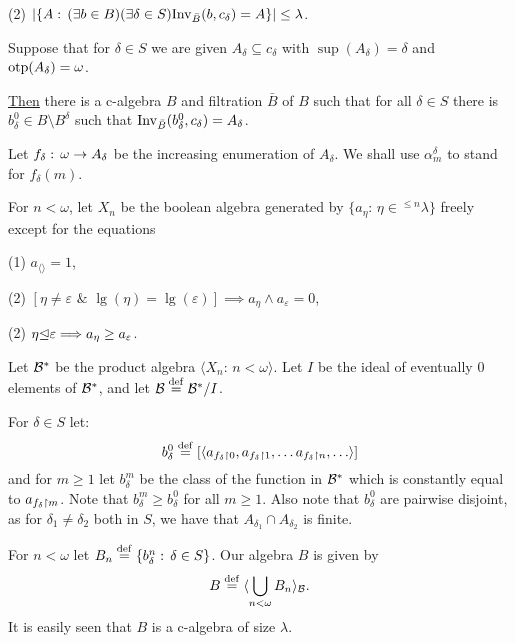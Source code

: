 \begin{Proof}
\begin{Note}

{\noindent (2)}
${\vert \{A:\,(\exists b\in B)(\exists\delta\in S) {\rm Inv}_{\bar{B}}(b,c_\delta)
=A\} \vert}\le\lambda$.
\end{Note}

\begin{Main Claim}\label{main} Suppose that
for $\delta\in S$ we are given $A_\delta\subseteq c_\delta$
with $\sup(A_\delta)=\delta$ and $\hbox{otp($A_\delta$)}=\omega$.

\underline{Then} there is a c-algebra $B$ and filtration $\bar{B}$ of $B$ such that
for all $\delta\in S$
there is $b^0_\delta\in B\setminus B^\delta$
such that ${\rm Inv}_{\bar{B}}(b^0_\delta,c_\delta)=A_\delta$.
\end{Main Claim}

\begin{Proof of the Main Claim} Let $f_\delta:\,\omega\rightarrow A_\delta$ be the
increasing enumeration of $A_\delta$.
We shall use $\alpha^\delta_m$ to stand for $f_\delta(m)$.

For $n<\omega$, let $X_n$ be the boolean algebra
generated by $\{a_\eta:\,\eta\in {}^{\le n}\lambda\}$ freely except for the
equations
\begin{description}
\item{(1)} $a_{\langle\rangle}=1$,
\item{(2)} $[\eta\neq\varepsilon\,\,\&\,\,\lg(\eta)=\lg(\varepsilon)]
\implies a_\eta\wedge a_\varepsilon=0$,
\item{(2)} $\eta{\trianglelefteq}\varepsilon\Longrightarrow a_\eta\ge a_\varepsilon$.
\end{description}

Let ${\cal B}^\ast$ be the product algebra $\langle
X_n:\, n<\omega\rangle$. Let $I$ be the ideal of eventually 0 elements
of ${\cal B}^\ast$, and let ${\cal B}\deq{\cal B}^\ast/I$. 

For $\delta\in S$ let:
\[
b^0_\delta\deq[\langle a_{f_\delta\rest 0}, a_{f_\delta\rest 1},\ldots
a_{f_\delta\rest n},\ldots\rangle]
\]
and for $m\ge 1$ let $b^m_\delta$ be the class of the function in ${{\cal B}}^\ast$
which is constantly equal to $a_{f_\delta\upharpoonright m}$.
Note that $b^m_\delta\ge b^0_\delta$ for all $m\ge 1$.
Also note that $b^0_{\delta}$ are pairwise disjoint, as for $\delta_1\neq\delta_2$
both in $S$, we have that $A_{\delta_1}\cap A_{\delta_2}$ is finite.

For $n<\omega$ let $B_n\deq\{b^n_\delta:\,\delta\in S\}$.
Our algebra $B$ is given by
\[
B\deq\langle \bigcup_{n<\omega}B_n\rangle_{\BB}.
\]
It is easily seen
that $B$ is a c-algebra of size $\lambda$.


\end{Proof of the Main Claim}
\end{Proof}
